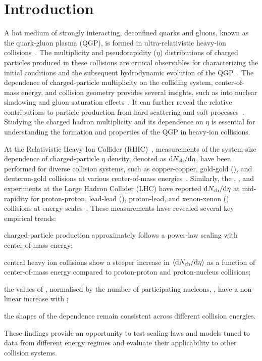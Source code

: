\section{Introduction}
\label{sec:introduction}
A hot medium of strongly interacting, deconfined quarks and gluons, known as the quark-gluon plasma (QGP), is formed in ultra-relativistic heavy-ion collisions~\cite{Busza:2018rrf}. The multiplicity and pseudorapidity ($\eta$) distributions of charged particles produced in these collisions are critical observables for characterizing the initial conditions and the subsequent hydrodynamic evolution of the QGP~\cite{Romatschke:2017ejr}. The dependence of charged-particle multiplicity on the colliding system, center-of-mass energy, and collision geometry provides several insights, such as into nuclear shadowing and gluon saturation effects~\cite{Albacete:2014fwa}. It can further reveal the relative contributions to particle production from hard scattering and soft processes~\cite{Kharzeev:2000ph, dEnterria:2011twh}. Studying the charged hadron multiplicity and its dependence on $\eta$ is essential for understanding the formation and properties of the QGP in heavy-ion collisions. 

At the Relativistic Heavy Ion Collider (RHIC)~\cite{HARRISON2003235}, measurements of the system-size dependence of charged-particle $\eta$ density, denoted as $\mbox{d$N_{\rm ch}$/d$\eta$}$, have been performed for diverse collision systems, such as copper-copper, gold-gold (\auau), and deuteron-gold collisions at various center-of-mass energies~\cite{PHENIX:2000owy,PHENIX:2004vdg,PHENIX:2018hho,PHOBOS:2000wxz,PHOBOS:2003fjw,PHOBOS:2010eyu,BRAHMS:2001gci,BRAHMS:2001llo,STAR:2001eyo}. Similarly, the \alice, \atlas, and \cms experiments at the Large Hadron Collider (LHC) have reported $\mbox{d$N_{\rm ch}$/d$\eta$}$ at mid-rapidity for proton-proton, lead-lead (\pbpb), proton-lead, and xenon-xenon (\xexe) collisions at \tev energy scales~\cite{ALICE:2009wpl,ALICE:2010cin,ALICE:2010khr,ALICE:2010mty,ALICE:2015juo,ALICE:2015olq,ALICE:2015qqj,ALICE:2017pcy,ALICE:2018cpu,ALICE:2020swj,CMS:2010wcx,CMS:2010qvf,CMS:2010tjh, CMS:2011aqh,CMS:2014kix,CMS:2015zrm,CMS:2017shj,CMS:2019gzk,CMS:2024ykx,ATLAS:2011ag,ATLAS:2015hkr}. These measurements have revealed several key empirical trends:
\begin{enumerate*}[label=(\arabic*)]
\item charged-particle production approximately follows a power-law scaling with center-of-mass energy;
\item central heavy ion collisions show a steeper increase in $\langle\mbox{d$N_{\rm ch}$/d$\eta$}\rangle$ as a function of center-of-mass energy compared to proton-proton and proton-nucleus collisions;
\item the values of \dndeta, normalised by the number of participating nucleons, \npart, have a non-linear increase with \npart;
\item the shapes of the \npart dependence remain consistent across different collision energies.
\end{enumerate*}
These findings provide an opportunity to test scaling laws and models tuned to data from different energy regimes and evaluate their applicability to other collision systems.

